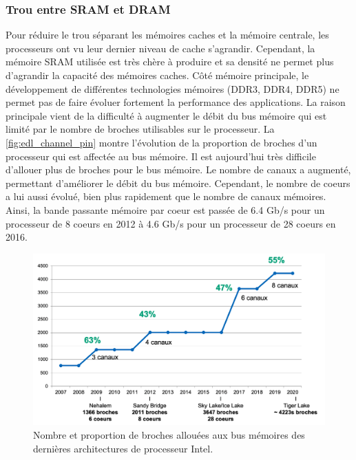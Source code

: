     \subsubsection{Trou entre SRAM et DRAM} 
        Pour réduire le trou séparant les mémoires caches et la mémoire centrale, les processeurs ont vu leur dernier niveau de cache s'agrandir. Cependant, la mémoire SRAM utilisée est très chère à produire et sa densité ne permet plus d'agrandir la capacité des mémoires caches. Côté mémoire principale, le développement de différentes technologies mémoires (DDR3, DDR4, DDR5) ne permet pas de faire évoluer fortement la performance des applications. La raison principale vient de la difficulté à augmenter le débit du bus mémoire qui est limité par le nombre de broches utilisables sur le processeur. La \autoref{fig:edl_channel_pin} montre l'évolution de la proportion de broches d'un processeur qui est affectée au bus mémoire. Il est aujourd'hui très difficile d'allouer plus de broches pour le bus mémoire. Le nombre de canaux a augmenté, permettant d'améliorer le débit du bus mémoire. Cependant, le nombre de coeurs a lui aussi évolué, bien plus rapidement que le nombre de canaux mémoires. Ainsi, la bande passante mémoire par coeur est passée de 6.4 Gb/s pour un processeur de 8 coeurs en 2012 à 4.6 Gb/s pour un processeur de 28 coeurs en 2016. 
        
        \begin{figure}
            \center
            \includegraphics[width=12cm]{images/edl_channel_pin.png}
            \caption{\label{fig:edl_channel_pin} Nombre et proportion de broches allouées aux bus mémoires des dernières architectures de processeur Intel.}
        \end{figure}
    
